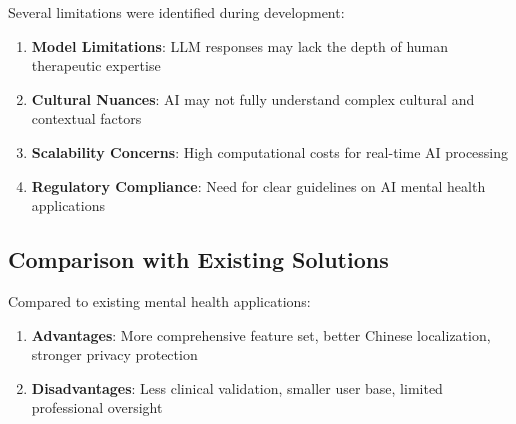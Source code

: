Several limitations were identified during development:

\begin{enumerate}
    \item \textbf{Model Limitations}: LLM responses may lack the depth of human therapeutic expertise
    \item \textbf{Cultural Nuances}: AI may not fully understand complex cultural and contextual factors
    \item \textbf{Scalability Concerns}: High computational costs for real-time AI processing
    \item \textbf{Regulatory Compliance}: Need for clear guidelines on AI mental health applications
\end{enumerate}

\subsection{Comparison with Existing Solutions}

Compared to existing mental health applications:

\begin{enumerate}
    \item \textbf{Advantages}: More comprehensive feature set, better Chinese localization, stronger privacy protection
    \item \textbf{Disadvantages}: Less clinical validation, smaller user base, limited professional oversight
\end{enumerate} 